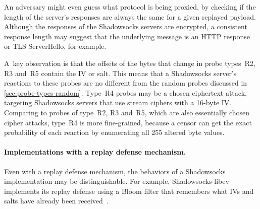 \documentclass[sigconf,letterpaper]{acmart}
\begin{document}
An adversary might even guess what protocol is being proxied,
by checking if the length of
the server's responses are always the same for a given replayed payload.
Although the responses of the Shadowsocks servers are encrypted,
a consistent response length may suggest that the underlying message
is an HTTP response or TLS ServerHello, for example.

A~key observation is that the offsets of the bytes that change in probe types~R2, R3 and~R5 contain the IV or salt.
This means that a Shadowsocks server's reactions to these probes are no different from the random probes discussed in \autoref{sec:probe-types-random}.
Type~R4 probes may be a chosen ciphertext attack, targeting Shadowsocks servers that use stream ciphers with a 16-byte IV.
Comparing to probes of type~R2, R3 and~R5,
which are also essentially chosen cipher attacks,
type~R4 is more fine-grained,
because a censor can get the exact probability of each reaction by enumerating all 255 altered byte values.

\paragraph{Implementations with a replay defense mechanism.}

Even with a replay defense mechanism, the behaviors of a Shadowsocks implementation may be distinguishable.
For example, Shadowsocks-libev implements its replay defense using
a Bloom filter that remembers what IVs and salts have already been received~\cite{bloom-filter}.
\end{document}
